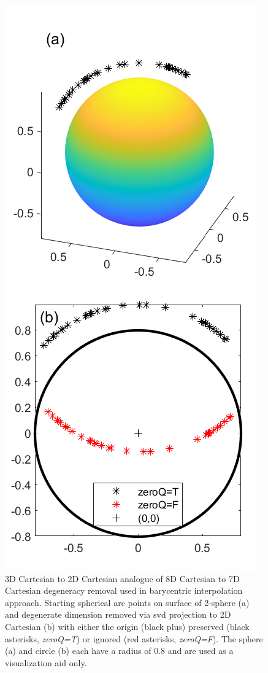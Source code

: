 \documentclass[preprint,12pt]{elsarticle}
\begin{document}
\begin{figure}
    \centering
    \includegraphics{bary-remove-deg.png}
    \caption{3D Cartesian to 2D Cartesian analogue of 8D Cartesian to 7D Cartesian degeneracy removal used in barycentric interpolation approach. Starting spherical arc points on surface of 2-sphere (a) and degenerate dimension removed via \acrlong{svd} projection to 2D Cartesian (b) with either the origin (black plus) preserved (black asterisks, \textit{zeroQ=T}) or ignored (red asterisks, \textit{zeroQ=F}). The sphere (a) and circle (b) each have a radius of 0.8 and are used as a visualization aid only.}
    \label{fig:bary-remove-deg}
\end{figure}
\end{document}
